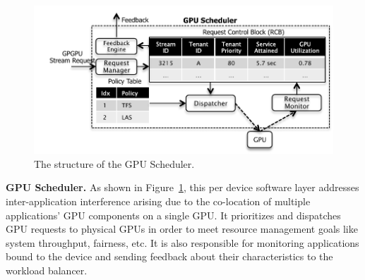 \begin{figure}[!t]
\centering
\includegraphics[width=\textwidth,height=\textheight,keepaspectratio]{figures/strings_archi4.pdf}
\caption{The structure of the GPU Scheduler.}
\label{fig:sched}
\end{figure}
\textbf{GPU Scheduler. }As shown in Figure~\ref{fig:sched}, this per device software layer addresses inter-application interference arising due to the co-location of multiple applications' GPU components on a single GPU. It prioritizes and dispatches GPU requests to physical GPUs in order to meet resource management goals like system throughput, fairness, etc. It is also responsible for monitoring applications bound to the device and sending feedback about their characteristics to the workload balancer.
